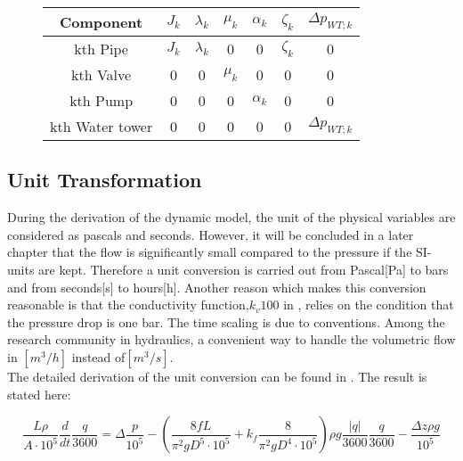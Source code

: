 \begin{figure}[H]
	\centering
\begin{tabular}{c|cccccc} 
  			\bfseries Component    &     $J_k$    &     $\lambda_k$    &    $\mu_k$    &   $\alpha_k$    &  $\zeta_k$   &	$\Delta p_{WT;k}$	\\ \hline
			kth Pipe		  	   &     $J_k$    &     $\lambda_k$    &    0          &   0             &  $\zeta_k$   &   0	    			\\ 
			kth Valve              &     0        &     0              &    $\mu_k$    &   0 		     &  0    		&   0					\\ 
			kth Pump 		       &     0        &     0              &    0          &   $\alpha_k$    &  0    		&   0	    			\\
			kth Water tower 	   &     0        &     0              &    0          &   0             &  0    		&   $\Delta p_{WT;k}$	    
\end{tabular}
		\label{tab:parametrization_model}

\end{figure}	

\subsection{Unit Transformation}
\label{unittransform}

During the derivation of the dynamic model, the unit of the physical variables are considered as pascals and seconds. However, it will be concluded in a later chapter that the flow is significantly small compared to the pressure if the SI-units are kept. Therefore a unit conversion is carried out from Pascal[Pa] to bars and from seconds[s] to hours[h]. Another reason which makes this conversion reasonable is that the conductivity function,$k_v100$ in , relies on the condition that the pressure drop is one bar. The time scaling is due to conventions. Among the research community in hydraulics, a convenient way to handle the volumetric flow in $[m^3/h]$ instead of$[m^3/s]$. 
\\
The detailed derivation of the unit conversion can be found in . The result is stated here: 

\begin{equation}
   \frac{L \rho}{A\cdot10^5} \frac{d}{dt}\frac{q}{3600} = \Delta \frac{p}{10^5} - (\frac{8fL}{\pi^{2}gD^5\cdot10^5} + k_f \frac{8}{\pi^2gD^4\cdot10^5}) \rho g \frac{|q|}{3600} \frac{q}{3600} - \frac{\Delta z \rho g}{10^5}
\end{equation}
